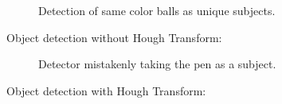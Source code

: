 \documentclass{sciposter}
\begin{document}
\begin{multicols}{3}
\begin{figure}[!h]
	\centering
			\setlength{\fboxsep}{1pt}
			\setlength{\fboxrule}{1pt}
	\caption{Detection of same color balls as unique subjects.}
	\label{fig:same_color}
\end{figure}

Object detection without Hough Transform:

\begin{figure}[!h]
	\centering
			\setlength{\fboxsep}{1pt}
			\setlength{\fboxrule}{1pt}
	\caption{Detector mistakenly taking the pen as a subject.}
	\label{fig:not_hough}
\end{figure}

Object detection with Hough Transform:


\end{multicols}
\end{document}
